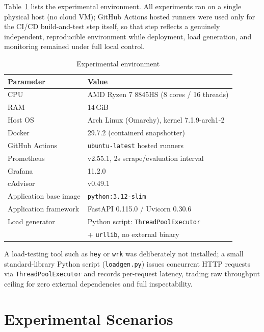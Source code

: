 \documentclass[conference]{IEEEtran}
\begin{document}
Table~\ref{tab:env} lists the experimental environment. All experiments ran
on a single physical host (no cloud VM); GitHub Actions hosted runners were
used only for the CI/CD build-and-test step itself, so that step reflects a
genuinely independent, reproducible environment while deployment, load
generation, and monitoring remained under full local control.

\begin{table}[t]
\centering
\caption{Experimental environment}
\label{tab:env}
\begin{tabular}{@{}ll@{}}
\toprule
\textbf{Parameter} & \textbf{Value} \\
\midrule
CPU & AMD Ryzen 7 8845HS (8 cores / 16 threads) \\
RAM & 14\,GiB \\
Host OS & Arch Linux (Omarchy), kernel 7.1.9-arch1-2 \\
Docker & 29.7.2 (containerd snapshotter) \\
GitHub Actions & \texttt{ubuntu-latest} hosted runners \\
Prometheus & v2.55.1, 2s scrape/evaluation interval \\
Grafana & 11.2.0 \\
cAdvisor & v0.49.1 \\
Application base image & \texttt{python:3.12-slim} \\
Application framework & FastAPI 0.115.0 / Uvicorn 0.30.6 \\
Load generator & Python script: \texttt{ThreadPoolExecutor} \\
& + \texttt{urllib}, no external binary \\
\bottomrule
\end{tabular}
\end{table}

A load-testing tool such as \texttt{hey} or \texttt{wrk} was deliberately not
installed; a small standard-library Python script (\texttt{loadgen.py})
issues concurrent HTTP requests via \texttt{ThreadPoolExecutor} and records
per-request latency, trading raw throughput ceiling for zero external
dependencies and full inspectability.

\section{Experimental Scenarios}
\label{sec:scenarios}
\end{document}
